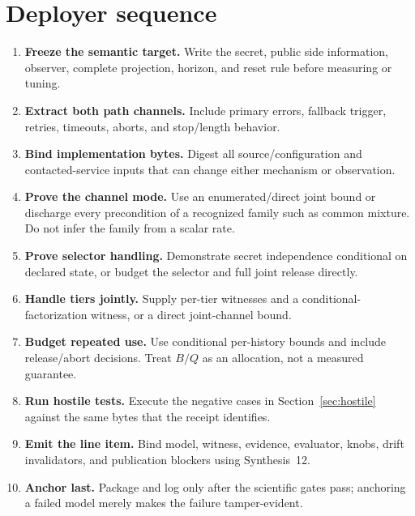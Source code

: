 \documentclass[11pt]{article}
\begin{document}
\section{Deployer sequence}\label{sec:deployer}
\begin{enumerate}[leftmargin=*]
\item \textbf{Freeze the semantic target.} Write the secret, public side information, observer, complete projection, horizon, and reset rule before measuring or tuning.
\item \textbf{Extract both path channels.} Include primary errors, fallback trigger, retries, timeouts, aborts, and stop/length behavior.
\item \textbf{Bind implementation bytes.} Digest all source/configuration and contacted-service inputs that can change either mechanism or observation.
\item \textbf{Prove the channel mode.} Use an enumerated/direct joint bound or discharge every precondition of a recognized family such as common mixture. Do not infer the family from a scalar rate.\cite{series:obsatten}
\item \textbf{Prove selector handling.} Demonstrate secret independence conditional on declared state, or budget the selector and full joint release directly.\cite{series:selectiontax}
\item \textbf{Handle tiers jointly.} Supply per-tier witnesses and a conditional-factorization witness, or a direct joint-channel bound.\cite{series:tieredobsvec}
\item \textbf{Budget repeated use.} Use conditional per-history bounds and include release/abort decisions. Treat \(B/Q\) as an allocation, not a measured guarantee.
\item \textbf{Run hostile tests.} Execute the negative cases in Section~\ref{sec:hostile} against the same bytes that the receipt identifies.
\item \textbf{Emit the line item.} Bind model, witness, evidence, evaluator, knobs, drift invalidators, and publication blockers using Synthesis~12.\cite{series:receiptitems}
\item \textbf{Anchor last.} Package and log only after the scientific gates pass; anchoring a failed model merely makes the failure tamper-evident.
\end{enumerate}
\end{document}
